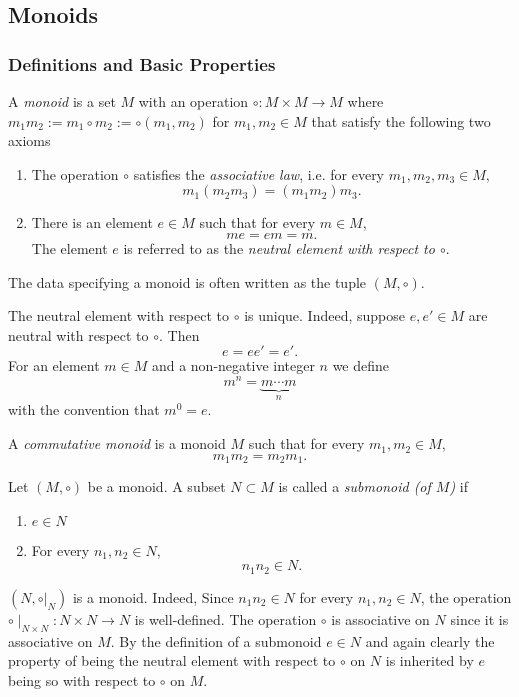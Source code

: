 \subsection{Monoids}
\subsubsection{Definitions and Basic Properties}
\begin{definition}
    A \textit{monoid} is a set $M$ with an operation $\circ : M\times M \rightarrow M$ where $m_1m_2 := m_1 \circ m_2 := \circ(m_1,m_2)$ for $m_1,m_2\in M$ that satisfy the following two axioms
    \begin{enumerate}
        \item The operation $\circ$ satisfies the \textit{associative law}, i.e. for every $m_1,m_2,m_3\in M$, 
        $$m_1(m_2m_3) = (m_1m_2)m_3.$$
        \item There is an element $e\in M$ such that for every $m\in M$,
        $$me = em = m.$$
        The element $e$ is referred to as the \textit{neutral element with respect to $\circ$}. 
    \end{enumerate}
    The data specifying a monoid is often written as the tuple $(M,\circ)$.
\end{definition}
\begin{remark}\label{UniquenessOfNeutralElement}
    The neutral element with respect to $\circ$ is unique. Indeed, suppose $e,e'\in M$ are neutral with respect to $\circ$. Then 
    $$e = e e' = e'.$$
    For an element $m\in M$ and a non-negative integer $n$ we define 
    $$m^n = \underbrace{m\cdots m}_{n}$$
    with the convention that $m^0 = e$.
\end{remark}
\begin{definition}
    A \textit{commutative monoid} is a monoid $M$ such that for every $m_1,m_2\in M$,
    $$m_1m_2 = m_2m_1.$$
\end{definition}
\begin{definition}
    Let $(M,\circ)$ be a monoid. A subset $N\subset M$ is called a \textit{submonoid (of $M$)} if 
    \begin{enumerate}
        \item $e\in N$
        \item For every $n_1,n_2\in N$,
        $$n_1n_2\in N.$$
    \end{enumerate}
\end{definition}
\begin{remark}\label{ASubmonoidIsAMonoid}
     $(N,\circ|_N)$ is a monoid. Indeed, Since $n_1n_2\in N$ for every $n_1,n_2\in N$, the operation $\circ\mid_{N\times N} : N\times N\rightarrow N$ is well-defined. The operation $\circ$ is associative on $N$ since it is associative on $M$. By the definition of a submonoid $e\in N$ and again clearly the property of being the neutral element with respect to $\circ$ on $N$ is inherited by $e$ being so with respect to $\circ$ on $M$.  
\end{remark}
